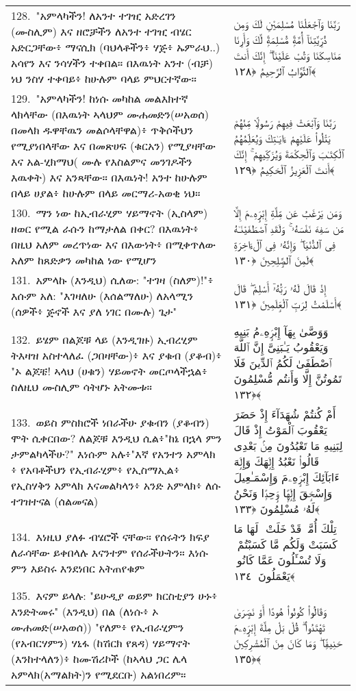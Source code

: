 \documentclass[11pt,a4paper,oneside]{article}%
\newcommand{\mytextarabic}[1]{\textarabic{ #1 \flushright}}
\begin{document}
\begin{longtable}{%
  @{}
    p{}
  @{~~~}
    p{}
    @{}
}
128.\ "አምላካችን! ለአንተ ተገዢ አድረገን (ሙስሊም) እና ዘሮቻችን ለአንተ ተገዢ ብሄር አድርጋቸው፥ ማናሲክ (ባህላቶችን፥ ሃጅ፥ ኡምራህ..) አሳየን እና ንሳሃችን ተቀበል። በእዉነት አንተ (ብቻ) ነህ ንስሃ ተቀባይ፥ ከሁሉም ባላይ ምህርተኛው። &  \mytextarabic{رَبَّنَا وَٱجْعَلْنَا مُسْلِمَيْنِ لَكَ وَمِن ذُرِّيَّتِنَآ أُمَّةًۭ مُّسْلِمَةًۭ لَّكَ وَأَرِنَا مَنَاسِكَنَا وَتُبْ عَلَيْنَآ ۖ إِنَّكَ أَنتَ ٱلتَّوَّابُ ٱلرَّحِيمُ ﴿١٢٨﴾}\\
129.\ "አምላካችን! ከነሱ መካከል መልእክተኛ ላክላቸው (በእዉነት ኣላህም ሙሐመድን(ሠአወሰ) በመላክ ዱዋቸዉን መልሶላቸዋል)፥ ጥቅሶችህን የሚያነበላቸው እና በመጽሀፍ (ቁርአን) የሚያዛቸው እና አል-ሂክማህ( ሙሉ የእስልምና መንገዶችን እዉቀት) እና አንጻቸው። በእዉነት! አንተ ከሁሉም በላይ ሀያል፥ ከሁሉም በላይ መርማሪ-አወቂ ነህ።  &  \mytextarabic{ رَبَّنَا وَٱبْعَثْ فِيهِمْ رَسُولًۭا مِّنْهُمْ يَتْلُوا۟ عَلَيْهِمْ ءَايَـٰتِكَ وَيُعَلِّمُهُمُ ٱلْكِتَـٰبَ وَٱلْحِكْمَةَ وَيُزَكِّيهِمْ ۚ إِنَّكَ أَنتَ ٱلْعَزِيزُ ٱلْحَكِيمُ ﴿١٢٩﴾}\\
130.\ ማን ነው ከኢብራሂም ሃይማኖት (ኢስላም) ዘወር የሚል ራሱን ከማታለል በቀር? በእዉነት፥ በዚህ አለም መረጥነው እና በእውነት፥ በሚቀጥለው አለም ከጸድቃን መካከል ነው የሚሆን &  \mytextarabic{وَمَن يَرْغَبُ عَن مِّلَّةِ إِبْرَٟهِۦمَ إِلَّا مَن سَفِهَ نَفْسَهُۥ ۚ وَلَقَدِ ٱصْطَفَيْنَـٰهُ فِى ٱلدُّنْيَا ۖ وَإِنَّهُۥ فِى ٱلْءَاخِرَةِ لَمِنَ ٱلصَّٟلِحِينَ ﴿١٣٠﴾}\\
131.\ አምላኩ (እንዲህ) ሲለው: "ተገዛ (ስለም)!"፥ እሱም አለ: "እገዛለሁ (እሰልማለሁ) ለአላሚን (ሰዎች፥ ጅኖች እና ያለ ነገር በሙሉ) ጌታ" &  \mytextarabic{إِذْ قَالَ لَهُۥ رَبُّهُۥٓ أَسْلِمْ ۖ قَالَ أَسْلَمْتُ لِرَبِّ ٱلْعَٟلَمِينَ ﴿١٣١﴾}\\
132.\ ይሄም በልጆቹ ላይ (እንዲገዙ) ኢብረሂም ትእዛዝ አስተላለፈ (ጋበዛቸው)፥ እና ያቁብ (ያቆብ)፥ "ኦ ልጆቼ! ኣላህ (ሀቁን) ሃይመኖት መርጦላችኋል፥ ስለዚህ ሙስሊም ሳትሆኑ አትሙቱ።  &  \mytextarabic{وَوَصَّىٰ بِهَآ إِبْرَٟهِۦمُ بَنِيهِ وَيَعْقُوبُ يَـٰبَنِىَّ إِنَّ ٱللَّهَ ٱصْطَفَىٰ لَكُمُ ٱلدِّينَ فَلَا تَمُوتُنَّ إِلَّا وَأَنتُم مُّسْلِمُونَ ﴿١٣٢﴾}\\
133.\ ወይስ ምስክሮች ነበራችሁ ያቁብን (ያቆብን) ሞት ሲቀርበው? ለልጆቹ እንዲህ ሲል፥"ከኔ በኋላ ምን ታምልካላችሁ?" እነሱም አሉ፥"እኛ የአንተን አምላክ ፥ የአባቶችህን የኢብራሂም፥ የኢስማኢል፥ የኢስሃቅን አምላክ እናመልካላን፥ አንድ አምላክ፥ ለሱ ተገዝተናል (ሰልመናል) &  \mytextarabic{ أَمْ كُنتُمْ شُهَدَآءَ إِذْ حَضَرَ يَعْقُوبَ ٱلْمَوْتُ إِذْ قَالَ لِبَنِيهِ مَا تَعْبُدُونَ مِنۢ بَعْدِى قَالُوا۟ نَعْبُدُ إِلَٟهَكَ وَإِلَٟهَ ءَابَآئِكَ إِبْرَٟهِۦمَ وَإِسْمَـٰعِيلَ وَإِسْحَٟقَ إِلَٟهًۭا وَٟحِدًۭا وَنَحْنُ لَهُۥ مُسْلِمُونَ ﴿١٣٣﴾}\\
134.\ እነዚህ ያለፉ ብሄሮች ናቸው። የሰሩትን ክፍያ ለራሳቸው ይቀበላሉ እናንተም የሰራችሁትን። እነሱ ምን እይስሩ እንደነበር አትጠየቁም  &  \mytextarabic{ تِلْكَ أُمَّةٌۭ قَدْ خَلَتْ ۖ لَهَا مَا كَسَبَتْ وَلَكُم مَّا كَسَبْتُمْ ۖ وَلَا تُسْـَٔلُونَ عَمَّا كَانُوا۟ يَعْمَلُونَ ﴿١٣٤﴾}\\
135.\ እናም ይላሉ: "ይሁዲያ ወይም ክርስቲያን ሁኑ፥ እንድትመሩ" (እንዲህ) በል (ለነሱ፥ ኦ ሙሐመድ(ሠአወሰ)) "የለም፥ የኢብራሂምን (የአብርሃምን) ሃኒፋ (ከሽርክ የጸዳ) ሃይማኖት (እንከተላለን)፥ ከሙሽሪኮች (ከኣላህ ጋር ሌላ አምላክ(አማልክት)ን የሚደርቡ) አልነበረም።  &  \mytextarabic{وَقَالُوا۟ كُونُوا۟ هُودًا أَوْ نَصَٟرَىٰ تَهْتَدُوا۟ ۗ قُلْ بَلْ مِلَّةَ إِبْرَٟهِۦمَ حَنِيفًۭا ۖ وَمَا كَانَ مِنَ ٱلْمُشْرِكِينَ ﴿١٣٥﴾}\\

\end{longtable}
\end{document}
